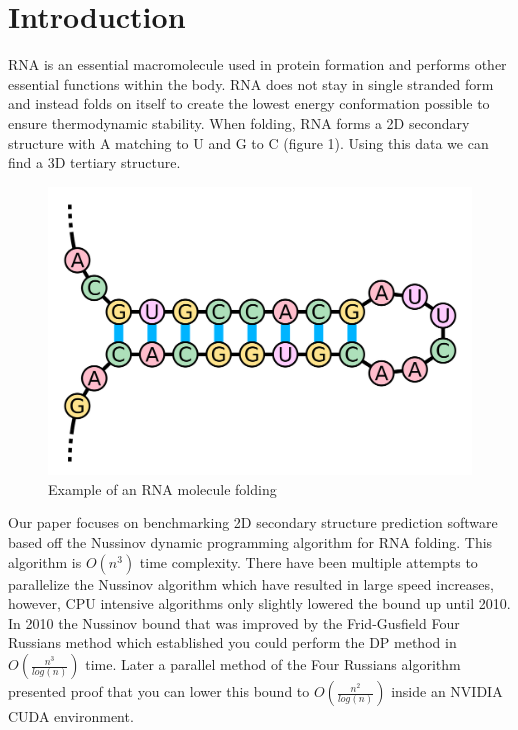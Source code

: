 \documentclass[12pt]{article}
\begin{document}
\section{Introduction}
\par RNA is an essential macromolecule used in protein formation and performs other essential functions within the body\cite{turner}. RNA does not stay in single stranded form and instead folds on itself to create the lowest energy conformation possible to ensure thermodynamic stability\cite{herschlag}. When folding, RNA forms a 2D secondary structure\cite{mccaskill} with A matching to U and G to C (figure 1).  Using this data we can find a 3D tertiary structure\cite{mccaskill}.
\begin{figure}[ht!]
  \centering
  \includegraphics[keepaspectratio, scale=0.12]{fold-example.png}
  \caption{Example of an RNA molecule folding}
  \label{fig:RNA Folding}
\end{figure}
\par Our paper focuses on benchmarking 2D secondary structure prediction software based off the Nussinov dynamic programming algorithm\cite{nussinov} for RNA folding. This algorithm is $O(n^3)$ time complexity. There have been multiple attempts to parallelize the Nussinov algorithm\cite{rizk, other-gpu} which have resulted in large speed increases, however, CPU intensive algorithms only slightly lowered the bound up until 2010\cite{minor-nussinov-improvement, chan}. In 2010 the Nussinov bound that was improved by the Frid-Gusfield Four Russians method which established you could perform the DP method in $O(\frac{n^3}{log(n)})$ time\cite{gusfield}. Later a parallel method of the Four Russians algorithm presented proof that you can lower this bound to $O(\frac{n^2}{log(n)})$ inside an NVIDIA CUDA environment\cite{balaji}.
\end{document}
